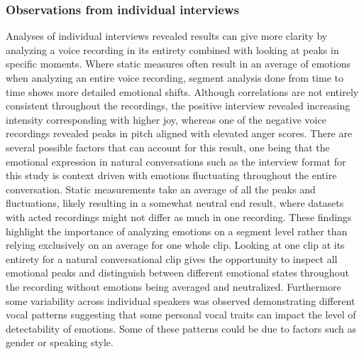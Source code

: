 \subsubsection{Observations from individual interviews}
Analyses of individual interviews revealed results can give more clarity by analyzing a voice recording in its entirety combined with looking at peaks in specific moments. Where static measures often result in an average of emotions when analyzing an entire voice recording, segment analysis done from time to time shows more detailed emotional shifts. Although correlations are not entirely consistent throughout the recordings, the positive interview revealed increasing intensity corresponding with higher joy, whereas one of the negative voice recordings revealed peaks in pitch aligned with elevated anger scores. 
There are several possible factors that can account for this result, one being that the emotional expression in natural conversations such as the interview format for this study is context driven with emotions fluctuating throughout the entire conversation. Static measurements take an average of all the peaks and fluctuations, likely resulting in a somewhat neutral end result, where datasets with acted recordings might not differ as much in one recording.
These findings highlight the importance of analyzing emotions on a segment level rather than relying exclusively on an average for one whole clip. Looking at one clip at its entirety for a natural conversational clip gives the opportunity to inspect all emotional peaks and distinguish between different emotional states throughout the recording without emotions being averaged and neutralized.
Furthermore some variability across individual speakers was observed demonstrating different vocal patterns suggesting that some personal vocal traits can impact the level of detectability of emotions. Some of these patterns could be due to factors such as gender or speaking style.
